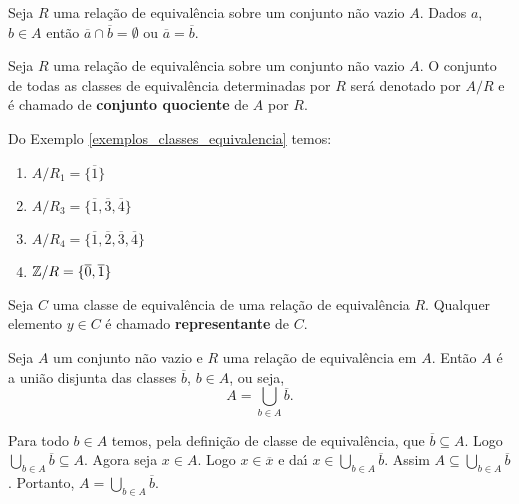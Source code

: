 \begin{corolario}
	Seja $R$ uma rela\c{c}\~ao de equival\^encia sobre um conjunto n\~ao vazio $A$. Dados $a$, $b \in A$ ent\~ao $\overline{a} \cap \overline{b} = \emptyset$ ou $\overline{a} = \overline{b}$.
\end{corolario}

\begin{definicao}
	Seja $R$ uma rela\c{c}\~ao de equival\^encia sobre um conjunto n\~ao vazio $A$. O conjunto de todas as classes de equival{\^e}ncia determinadas por $R$ ser{\'a} denotado por $A/R$ e {\'e} chamado de \textbf{conjunto quociente} de $A$ por $R$.
\end{definicao}

\begin{exemplos}
	Do Exemplo \ref{exemplos_classes_equivalencia} temos:
	\begin{enumerate}[label={\arabic*})]
		\item $A/R_1 = \{\overline{1}\}$
		\item $A/R_3 = \{\overline{1},\overline{3},\overline{4}\}$
		\item $A/R_4 = \{\overline{1},\overline{2},\overline{3},\overline{4}\}$
		\item $\mathbb{Z}/R = \{\overline{0},\overline{1}\}$
	\end{enumerate}
\end{exemplos}

\begin{definicao}
	Seja $C$ uma classe de equival{\^e}ncia de uma rela{\c c}{\~a}o de equival{\^e}ncia $R$. Qualquer elemento $y\in C$ {\'e} chamado \textbf{representante} de $C$.
\end{definicao}

\begin{proposicao}
	Seja $A$ um conjunto n{\~a}o vazio e $R$ uma rela{\c c}{\~a}o de equival{\^e}ncia em $A$. Ent{\~a}o $A$ {\'e} a uni{\~a}o disjunta das classes $\overline{b}$, $b \in A$, ou seja,
	\[
		A = \bigcup_{b\in A}\overline{b}.
	\]
\end{proposicao}
\begin{prova}
	Para todo $b\in A$ temos, pela defini\c{c}\~ao de classe de equival\^encia, que $\overline{b}\subseteq A$. Logo $\bigcup_{b\in A}\overline{b}\subseteq A$. Agora seja $x\in A$. Logo $x \in \overline{x}$ e da{\'\i} $x\in \bigcup_{b\in A}\overline{b}$. Assim $A\subseteq\bigcup_{b\in A}\overline{b}$. Portanto, $A=\bigcup_{b\in A}\overline{b}$.
\end{prova}

